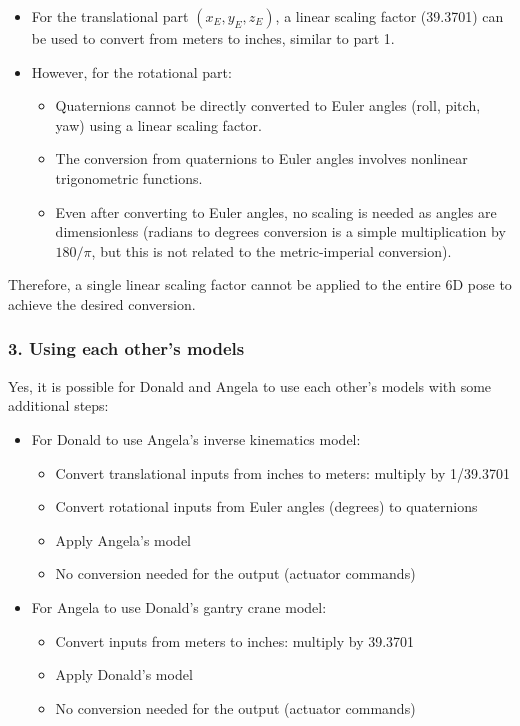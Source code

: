 \begin{solution}
\begin{itemize}
    \item For the translational part $(x_E, y_E, z_E)$, a linear scaling factor (39.3701) can be used to convert from meters to inches, similar to part 1.
    \item However, for the rotational part:
    \begin{itemize}
        \item Quaternions cannot be directly converted to Euler angles (roll, pitch, yaw) using a linear scaling factor.
        \item The conversion from quaternions to Euler angles involves nonlinear trigonometric functions.
        \item Even after converting to Euler angles, no scaling is needed as angles are dimensionless (radians to degrees conversion is a simple multiplication by $180/\pi$, but this is not related to the metric-imperial conversion).
    \end{itemize}
\end{itemize}

Therefore, a single linear scaling factor cannot be applied to the entire 6D pose to achieve the desired conversion.

\subsubsection*{3. Using each other's models}

Yes, it is possible for Donald and Angela to use each other's models with some additional steps:

\begin{itemize}
    \item For Donald to use Angela's inverse kinematics model:
    \begin{itemize}
        \item Convert translational inputs from inches to meters: multiply by 1/39.3701
        \item Convert rotational inputs from Euler angles (degrees) to quaternions
        \item Apply Angela's model
        \item No conversion needed for the output (actuator commands)
    \end{itemize}
    
    \item For Angela to use Donald's gantry crane model:
    \begin{itemize}
        \item Convert inputs from meters to inches: multiply by 39.3701
        \item Apply Donald's model
        \item No conversion needed for the output (actuator commands)
    \end{itemize}
\end{itemize}


\end{solution}
